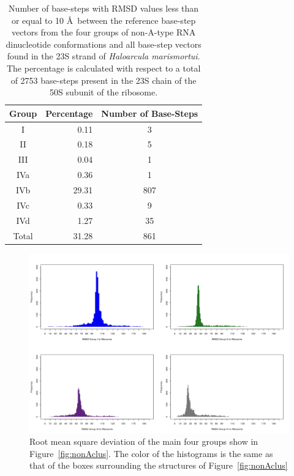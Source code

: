 \begin{table}[htbp]
\begin{center}
{\footnotesize
\begin{tabular}{c|r|c}
\hline
\bf{Group} & \bf{Percentage} & \bf{Number of Base-Steps}\\ \hline
I   & 0.11  & 3   \\ \hline
II  & 0.18  & 5  \\ \hline
III & 0.04  & 1  \\ \hline
IVa & 0.36  & 1  \\ \hline
IVb & 29.31 & 807 \\ \hline
IVc & 0.33  & 9  \\ \hline
IVd & 1.27  & 35 \\ \hline \hline
Total & 31.28 & 861   \\ \hline
\end{tabular}
}
\caption{Number of base-steps  with RMSD values less than  or equal to
  10 \AA ~between the reference  base-step vectors from the four groups
  of  non-A-type  RNA  dinucleotide  conformations and  all  base-step
  vectors found in the  23S strand of \textit{Haloarcula marismortui}.
  The  percentage  is calculated  with  respect  to  a total  of  2753
  base-steps  present in  the  23S chain  of  the 50S  subunit of  the
  ribosome.}
\label{tab:nonA}
\end{center}
\end{table}

\begin{figure}[htbp]
 \centering
\includegraphics[angle=90, scale=0.6]{Chapter2/RMSDschneider1.png}
\caption{Root mean square deviation of the main four groups show in
  Figure~\ref{fig:nonAclus}. The color of the histograms is the same
  as that of the boxes surrounding the structures of
  Figure~\ref{fig:nonAclus}}
 \label{fig:histo1}
\end{figure}

